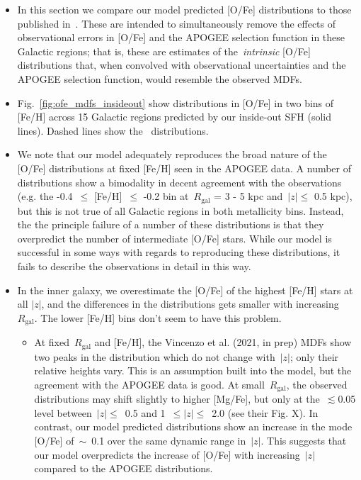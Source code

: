 \documentclass[fleqn, usenatbib]{mnras}
\begin{document}
\begin{itemize} 
	\item In this section we compare our model predicted [O/Fe] distributions 
	to those published in~\citet{Vincenzo2021}. These are intended 
	to simultaneously remove the effects of observational errors in [O/Fe] 
	and the APOGEE selection function in these Galactic regions; that is, 
	these are estimates of the~\textit{intrinsic} [O/Fe] distributions that, 
	when convolved with observational uncertainties and the APOGEE selection 
	function, would resemble the observed MDFs. 

	\item Fig.~\ref{fig:ofe_mdfs_insideout} show distributions in [O/Fe] in 
	two bins of [Fe/H] across 15 Galactic regions predicted by our inside-out 
	SFH (solid lines). Dashed lines show the~\citet{Vincenzo2021} distributions. 

	\item We note that our model adequately reproduces the broad nature of the 
	[O/Fe] distributions at fixed [Fe/H] seen in the APOGEE data. A number of 
	distributions show a bimodality in decent agreement with the observations 
	(e.g. the -0.4~$\leq$ [Fe/H]~$\leq$ -0.2 bin at~$R_\text{gal}$ = 3 - 5 kpc 
	and~$\left|z\right|\leq$ 0.5 kpc), but this is not true of all Galactic 
	regions in both metallicity bins. Instead, the the principle failure of a 
	number of these distributions is that they overpredict the number of 
	intermediate [O/Fe] stars. While our model is successful in some ways with 
	regards to reproducing these distributions, it fails to describe the 
	observations in detail in this way. 

	\item In the inner galaxy, we overestimate the [O/Fe] of the highest 
	[Fe/H] stars at all $\left|z\right|$, and the differences in the 
	distributions gets smaller with increasing~$R_\text{gal}$. The lower 
	[Fe/H] bins don't seem to have this problem. 
	\begin{itemize} 
		\item At fixed~$R_\text{gal}$ and [Fe/H], the Vincenzo et al. (2021, 
		in prep) MDFs show two peaks in the distribution which do not change 
		with~$\left|z\right|$; only their relative heights vary. This is an 
		assumption built into the model, but the agreement with the APOGEE data 
		is good. At small~$R_\text{gal}$, the observed distributions may shift 
		slightly to higher [Mg/Fe], but only at the~$\lesssim$0.05 level 
		between~$\left|z\right|\leq$~0.5 and 1~$\leq\left|z\right|\leq$~2.0 
		(see their Fig. X). In contrast, our model predicted distributions show 
		an increase in the mode [O/Fe] of~$\sim$~0.1 over the same dynamic 
		range in~$\left|z\right|$. This suggests that our model overpredicts 
		the increase of [O/Fe] with increasing~$\left|z\right|$ compared to the 
		APOGEE distributions. 


\end{itemize}
\end{itemize}
\end{document}
